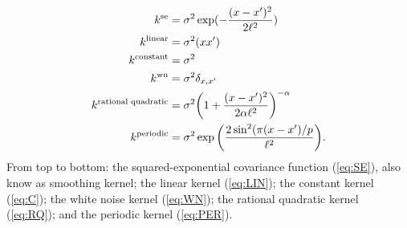 \begin{align}
k^\text{se} &= \sigma^2 \exp(-\frac{(x-x^\prime)^2}{2\ell^2}) \label{eq:SE}\\
k^\text{linear} &=   \sigma^2(x x^\prime) \label{eq:LIN}\\
k^{\text{constant}} &=   \sigma^2\label{eq:C}\\
k^\text{wn} &= \sigma^2 \delta_{x,x^\prime} \label{eq:WN} \\
k^{\text{rational quadratic}}  &=    \sigma^2 \bigg(1 + \frac{(x - x^\prime)^2}{2 \alpha \ell^2} \bigg)^{-\alpha} \label{eq:RQ} \\
k^\text{periodic} &=  \sigma^2 \exp \bigg( \frac{2 \sin^2 ( \pi (x - x^\prime)/p}{\ell^2} \bigg). \label{eq:PER}
\end{align}
From top to bottom: the squared-exponential covariance function (\ref{eq:SE}),
also know as smoothing kernel; the linear kernel (\ref{eq:LIN});  the constant 
kernel (\ref{eq:C}); the white noise
kernel (\ref{eq:WN}); the
rational quadratic kernel (\ref{eq:RQ}); and the periodic kernel (\ref{eq:PER}).
